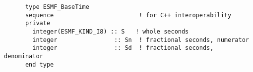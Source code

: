\begin{verbatim}
      type ESMF_BaseTime
      sequence                        ! for C++ interoperability
      private
        integer(ESMF_KIND_I8) :: S   ! whole seconds
        integer                :: Sn  ! fractional seconds, numerator
        integer                :: Sd  ! fractional seconds, denominator
      end type
\end{verbatim}
